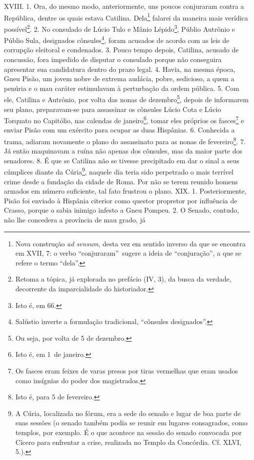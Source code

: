 XVIII. 1. Ora, do mesmo modo, anteriormente, uns poucos conjuraram contra a República, dentre os quais estava Catilina. Dela\footnote{Nova construção \emph{ad
sensum}, desta vez em sentido inverso da que se encontra em XVII, 7: o verbo
``conjuraram''\ sugere a ideia de ``conjuração'', a que se refere o termo
``dela''.} falarei da maneira mais verídica possível\footnote{Retoma a tópica,
já explorada no prefácio (IV, 3), da busca da verdade, decorrente da
imparcialidade do historiador.}. 2. No consulado de Lúcio Tulo e Mânio
Lépido\footnote{Isto é, em 66.}, Públio Autrônio e Públio Sula, designados
cônsules\footnote{Salústio inverte a formulação tradicional, ``cônsules
designados''.}, foram acusados de acordo com as leis de corrupção eleitoral e
condenados. 3. Pouco tempo depois, Catilina, acusado de concussão, fora
impedido de disputar o consulado porque não conseguira apresentar sua
candidatura dentro do prazo legal. 4. Havia, na mesma época, Gneu Pisão, um
jovem nobre de extrema audácia, pobre, sedicioso, a quem a penúria e o mau
caráter estimulavam à perturbação da ordem pública. 5. Com ele, Catilina e
Autrônio, por volta das nonas de dezembro\footnote{Ou seja, por volta de 5 de
dezembro.}, depois de informarem seu plano, preparavam-se para assassinar os
cônsules Lúcio Cota e Lúcio Torquato no Capitólio, nas calendas de
janeiro\footnote{Isto é, em 1\oi\ de janeiro.}, tomar eles próprios os
fasces\footnote{Os fasces eram feixes de varas presos por tiras vermelhas que
eram usados como insígnias do poder dos magistrados.} e enviar Pisão com um
exército para ocupar as duas Hispânias. 6. Conhecida a trama, adiaram novamente
o plano do assassinato para as nonas de fevereiro\footnote{Isto é, para 5 de
fevereiro.}. 7. Já então maquinavam a ruína não apenas dos cônsules, mas da
maior parte dos senadores. 8. É que se Catilina não se tivesse precipitado em
dar o sinal a seus cúmplices diante da Cúria\footnote{A Cúria, localizada no
fórum, era a sede do senado e lugar de boa parte de suas sessões (o senado
também podia se reunir em lugares consagrados, como templos, por exemplo. É o
que acontece na sessão do senado convocada por Cícero para enfrentar a crise,
realizada no Templo da Concórdia. Cf. XLVI, 5.).}, naquele dia teria sido
perpetrado o mais terrível crime desde a fundação da cidade de Roma. Por não se
terem reunido homens armados em número suficiente, tal fato frustrou o plano.
XIX. 1. Posteriormente, Pisão foi enviado à Hispânia citerior como questor
propretor por influência de Crasso, porque o sabia inimigo infesto a Gneu
Pompeu. 2. O Senado, contudo, não lhe concedera a província de mau grado, já
